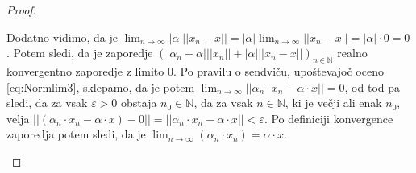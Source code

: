 \documentclass[a4paper, 10pt]{article}
\newcommand{\abs}[1]{\ensuremath{\lvert #1 \rvert}}
\newcommand{\mth}[1]{\ensuremath{\mathbb{#1}}}
\newcommand{\N}{\mth{N}}
\newcommand{\norm}[1]{\abs{\abs{#1}}}
\begin{document}
\begin{proof}
\begin{enumerate}[i)]
						Dodatno vidimo, da je $\lim_{n\to\infty}\abs{\alpha}\norm{x_n - x} = \abs{\alpha}\lim_{n\to\infty}\norm{x_n - x} = \abs{\alpha}\cdot 0 = 0$. Potem sledi, da je zaporedje $\left(\abs{\alpha_n - \alpha}\norm{x_n} + \abs{\alpha}\norm{x_n - x}\right)_{n\in\N}$ realno konvergentno zaporedje z limito $0$. Po pravilu o sendviču, upoštevajoč oceno \eqref{eq:Normlim3}, sklepamo, da je potem $\lim_{n\to\infty}\norm{\alpha_n\cdot x_n - \alpha\cdot x} = 0$, od tod pa sledi, da za vsak $\varepsilon > 0$ obstaja $n_0\in\N$, da za vsak $n\in\N$, ki je večji ali enak $n_0$, velja $\norm{(\alpha_n\cdot x_n - \alpha\cdot x) - 0}=\norm{\alpha_n\cdot x_n - \alpha\cdot x} < \varepsilon$. Po definiciji konvergence zaporedja potem sledi, da je $\lim_{n\to\infty}(\alpha_n\cdot x_n) = \alpha\cdot x$.
					\end{enumerate}
			\end{proof}
\end{document}
